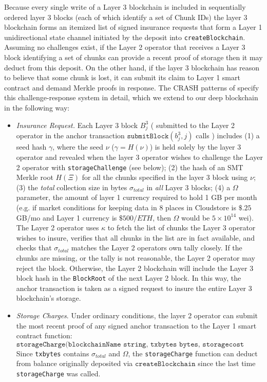 \documentclass{article}
\newcommand{\block}[2]{B^{#1}_{#2}}
\newcommand{\blockhash}[2]{b^{#1}_{#2}}
\newcommand{\keyroot}{\kappa}
\newcommand{\hash}[1]{H(#1)}
\newcommand{\submitblock}[2]{\texttt{submitBlock}(#2, #1)}
\newcommand{\maxstoragecost}{\Omega}
\newcommand{\seedhash}{\gamma}
\newcommand{\seed}{\nu}
\begin{document}
Because every single write of a Layer 3 blockchain is included in sequentially ordered layer 3 blocks (each of which identify a set of Chunk IDs) the layer 3 blockchain forms an itemized list of signed insurance requests that form a Layer 1 unidirectional state channel initiated by the deposit into \texttt{createBlockchain}.  Assuming no challenges exist, if the Layer 2 operator that receives a Layer 3 block identifying a set of chunks can provide a recent proof of storage then it may deduct from this deposit.   On the other hand, if the layer 3 blockchain has reason to believe that some chunk is lost, it can submit its claim to Layer 1 smart contract and demand Merkle proofs in response.   The CRASH patterns of \cite{swarm} specify this challenge-response system in detail, which we extend to our deep blockchain in the following way:
\begin{itemize}
    \item  {\em Insurance Request.} Each Layer 3 block $\block{3}{j}$ ( submitted to the Layer 2 operator in the anchor transaction $\submitblock{j}{\blockhash{3}{j}}$ calls ) includes (1) a seed hash $\seedhash$, where the seed $\seed$ ($\seedhash=\hash{\seed}$) is held solely by the layer 3 operator and  revealed when the layer 3 operator wishes to challenge the Layer 2 operator with \texttt{storageChallenge} (see below); (2) the hash of an SMT Merkle root $H(\Xi)$ for all the chunks specified in the layer 3 block using $\seed$; (3)   the {\em total} collection size in bytes $\sigma_{total}$ in {\em all} Layer 3 blocks; (4) a $\maxstoragecost$ parameter, the amount of layer 1 currency required to hold 1 GB per month (e.g. if market conditions for keeping data in 8 places in Cloudstore is $\$.25$ GB/mo and Layer 1 currency is $\$500/ETH$, then $\maxstoragecost$ would be $5\times10^14$ wei).  The Layer 2 operator uses $\keyroot$ to fetch the list of chunks the Layer 3 operator wishes to insure, verifies that all chunks in the list are in fact available, and checks that $\sigma_{total}$ matches the  Layer 2 operators own tally closely.  If the chunks are missing, or the tally is not reasonable, the Layer 2 operator may reject the block.  Otherwise, the Layer 2 blockchain will include the Layer 3 block hash in the  \texttt{BlockRoot} of the next Layer 2 block.  In this way, the anchor transaction is taken as a signed request to insure the entire Layer 3 blockchain's storage.  
      
    \item {\em Storage Charges}.   Under ordinary conditions, the layer 2 operator can submit the most recent proof of any signed anchor transaction to the Layer 1 smart contract function:
    \[ 
    \texttt{storageCharge(blockchainName string, txbytes bytes, storagecost uint64, sig bytes)}
    \] 
    Since \texttt{txbytes}  contains $\sigma_{total}$ and $\maxstoragecost$, the \texttt{storageCharge} function can deduct from balance originally deposited via $\texttt{createBlockchain}$ since the last time \texttt{storageCharge} was called.
    

\end{itemize}
\end{document}
